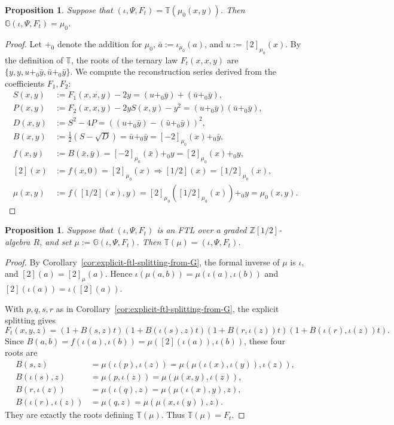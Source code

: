 \documentclass[a4paper]{amsart}
\theoremstyle{plain}
\newtheorem{proposition}[subsubsection]{Proposition}
\theoremstyle{definition}
\newcommand{\ZZ}{\mathbb{Z}}
\begin{document}
\begin{proposition}\label{prop:G-inverse-of-T}
	Suppose that $(\iota, \Psi, F_t)=\mathbb{T}(\mu_0(x,y))$. Then $\mathbb{G}(\iota, \Psi, F_t)=\mu_0$.
\end{proposition}
\begin{proof}
	Let $+_0$ denote the addition for $\mu_0$, $\bar{a}:=\iota_{\mu_0}(a)$, and $u:=[2]_{\mu_{0}}(x)$. By the definition of $\mathbb{T}$, the roots of the ternary law $F_t(x,x,y)$ are $\{y,y,u+_0\bar{y},\bar{u}+_0\bar{y}\}$. We compute the reconstruction series derived from the coefficients $F_1,F_2$:
	\[
		\begin{aligned}
			S(x,y)   & :=F_1(x,x,y)-2y=(u+_0\bar{y})+(\bar{u}+_0\bar{y}),                       \\
			P(x,y)   & :=F_2(x,x,y)-2yS(x,y)-y^2=(u+_0\bar{y})(\bar{u}+_0\bar{y}),              \\
			D(x,y)   & :=S^2-4P=((u+_0\bar{y})-(\bar{u}+_0\bar{y}))^2,                          \\
			B(x,y)   & :=\tfrac12(S-\sqrt{D})=\bar{u}+_0\bar{y}=[-2]_{\mu_{0}}(x)+_0\bar{y},    \\
			f(x,y)   & :=B(\bar{x},\bar{y})=[-2]_{\mu_{0}}(\bar{x})+_0 y=[2]_{\mu_{0}}(x)+_0 y, \\
			[2](x)   & :=f(x,0)=[2]_{\mu_{0}}(x) \Longrightarrow [1/2](x)=[1/2]_{\mu_{0}}(x),   \\
			\mu(x,y) & :=f([1/2](x),y)=[2]_{\mu_{0}}([1/2]_{\mu_{0}}(x))+_0 y=\mu_0(x,y).
		\end{aligned}
	\]
\end{proof}

\begin{proposition}\label{prop:T-inverse-of-G}
	Suppose that $(\iota,\Psi,F_t)$ is an FTL over a graded $\ZZ[1/2]$-algebra $R$, and set $\mu:=\mathbb{G}(\iota,\Psi,F_t)$. Then $\mathbb{T}(\mu)=(\iota,\Psi,F_t)$.
\end{proposition}
\begin{proof}
	By Corollary~\ref{cor:explicit-ftl-splitting-from-G}, the formal inverse of $\mu$ is $\iota$, and $[2](a) = [2]_{\mu}(a)$. Hence $\iota(\mu(a,b))=\mu(\iota(a),\iota(b))$ and $[2](\iota(a))=\iota([2](a))$.

	With $p,q,s,r$ as in Corollary~\ref{cor:explicit-ftl-splitting-from-G}, the explicit splitting gives
	\[
		F_t(x,y,z)=(1+B(s,z)t)(1+B(\iota(s),z)t)(1+B(r,\iota(z))t)(1+B(\iota(r),\iota(z))t).
	\]
	Since $B(a,b)=f(\iota(a),\iota(b))=\mu([2](\iota(a)),\iota(b))$, these four roots are
	\[
		\begin{aligned}
			B(s,z)               & =\mu(\iota(p),\iota(z))=\mu(\mu(\iota(x),\iota(y)),\iota(z)), \\
			B(\iota(s),z)        & =\mu(p,\iota(z))=\mu(\mu(x,y),\iota(z)),                      \\
			B(r,\iota(z))        & =\mu(\iota(q),z)=\mu(\mu(\iota(x),y),z),                      \\
			B(\iota(r),\iota(z)) & =\mu(q,z)=\mu(\mu(x,\iota(y)),z).
		\end{aligned}
	\]
	They are exactly the roots defining $\mathbb{T}(\mu)$. Thus $\mathbb{T}(\mu)=F_t$.
\end{proof}
\end{document}
